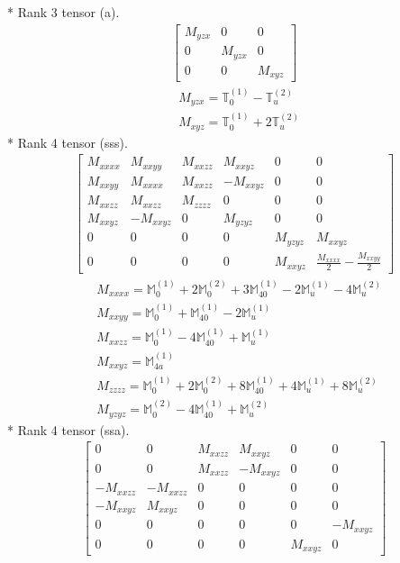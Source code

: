 \documentclass[fleqn,8pt,landscape]{jsarticle}
\begin{document}
* Rank 3 tensor (a).
\begin{align*}
\begin{bmatrix} M_{yzx} & 0 & 0 \\ 0 & M_{yzx} & 0 \\ 0 & 0 & M_{xyz} \end{bmatrix}
\end{align*}
\begin{align*}
& M_{yzx} = \mathbb{T}_{0}^{(1)} - \mathbb{T}_{u}^{(2)} \\
& M_{xyz} = \mathbb{T}_{0}^{(1)} + 2 \mathbb{T}_{u}^{(2)}
\end{align*}
* Rank 4 tensor (sss).
\begin{align*}
\begin{bmatrix} M_{xxxx} & M_{xxyy} & M_{xxzz} & M_{xxyz} & 0 & 0 \\ M_{xxyy} & M_{xxxx} & M_{xxzz} & - M_{xxyz} & 0 & 0 \\ M_{xxzz} & M_{xxzz} & M_{zzzz} & 0 & 0 & 0 \\ M_{xxyz} & - M_{xxyz} & 0 & M_{yzyz} & 0 & 0 \\ 0 & 0 & 0 & 0 & M_{yzyz} & M_{xxyz} \\ 0 & 0 & 0 & 0 & M_{xxyz} & \frac{M_{xxxx}}{2} - \frac{M_{xxyy}}{2} \end{bmatrix}
\end{align*}
\begin{align*}
& M_{xxxx} = \mathbb{M}_{0}^{(1)} + 2 \mathbb{M}_{0}^{(2)} + 3 \mathbb{M}_{40}^{(1)} - 2 \mathbb{M}_{u}^{(1)} - 4 \mathbb{M}_{u}^{(2)} \\
& M_{xxyy} = \mathbb{M}_{0}^{(1)} + \mathbb{M}_{40}^{(1)} - 2 \mathbb{M}_{u}^{(1)} \\
& M_{xxzz} = \mathbb{M}_{0}^{(1)} - 4 \mathbb{M}_{40}^{(1)} + \mathbb{M}_{u}^{(1)} \\
& M_{xxyz} = \mathbb{M}_{4a}^{(1)} \\
& M_{zzzz} = \mathbb{M}_{0}^{(1)} + 2 \mathbb{M}_{0}^{(2)} + 8 \mathbb{M}_{40}^{(1)} + 4 \mathbb{M}_{u}^{(1)} + 8 \mathbb{M}_{u}^{(2)} \\
& M_{yzyz} = \mathbb{M}_{0}^{(2)} - 4 \mathbb{M}_{40}^{(1)} + \mathbb{M}_{u}^{(2)}
\end{align*}
* Rank 4 tensor (ssa).
\begin{align*}
\begin{bmatrix} 0 & 0 & M_{xxzz} & M_{xxyz} & 0 & 0 \\ 0 & 0 & M_{xxzz} & - M_{xxyz} & 0 & 0 \\ - M_{xxzz} & - M_{xxzz} & 0 & 0 & 0 & 0 \\ - M_{xxyz} & M_{xxyz} & 0 & 0 & 0 & 0 \\ 0 & 0 & 0 & 0 & 0 & - M_{xxyz} \\ 0 & 0 & 0 & 0 & M_{xxyz} & 0 \end{bmatrix}
\end{align*}
\end{document}
